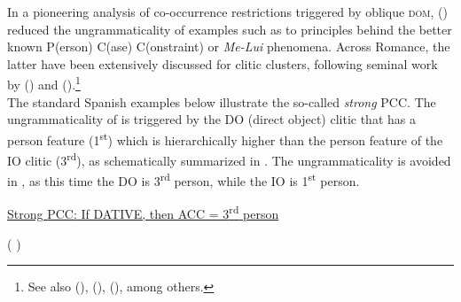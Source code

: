 \documentclass[output=paper,colorlinks,citecolor=brown,draft,draftmode]{langscibook}
\begin{document}
In a pioneering analysis of co-occurrence restrictions triggered by oblique \textsc{dom}, \citeauthor{ormromero07} (\citeyear{ormromero07}) reduced the ungrammaticality of examples such as  to principles behind the better known \textsc{P}(erson) \textsc{C}(ase) \textsc{C}(onstraint) or \textit{Me-Lui} phenomena. Across Romance, the latter have been extensively discussed for clitic clusters, following seminal work by \citeauthor{Perlmutter1971} (\citeyear{Perlmutter1971})
and \citeauthor{bonet1991} (\citeyear{bonet1991}).\footnote{See also \citeauthor{albizu1997} (\citeyear{albizu1997}), \citeauthor{anag2003} (\citeyear{anag2003}), \citeauthor{BejRez2003} (\citeyear{BejRez2003}), among others.} \\
\indent  The standard Spanish examples below illustrate the so-called \textit{strong} \textsc{PCC}. The ungrammaticality of  is triggered by the DO (direct object) clitic that has a person feature (1\textsuperscript{st}) which is hierarchically higher than the person feature of the IO clitic (3\textsuperscript{rd}), as schematically summarized in . The ungrammaticality is avoided in , as this time the DO is 3\textsuperscript{rd} person, while the IO is 1\textsuperscript{st} person.

\ea  \ul{Strong \textsc{PCC}: If DATIVE, then ACC = 3\textsuperscript{rd} person} \label{ex:irimia:StrongPCCformulation}
\z

  (\citeauthor{ormromero07} \citeyear{ormromero07}) \label{ex:irimia:StrongPCCanditsgrammaticalityORexamples}
\z
\z
\end{document}
